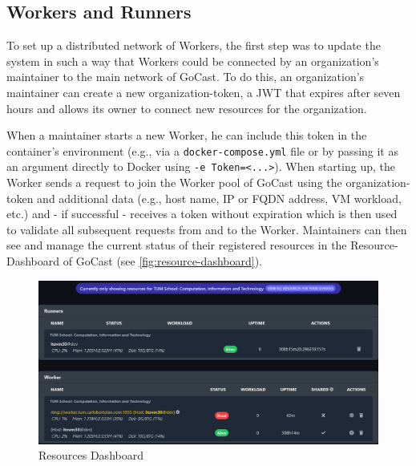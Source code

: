 \subsection{Workers and Runners}
To set up a distributed network of Workers, the first step was to update the system in such a way that Workers could be connected by an organization's maintainer to the main network of GoCast. To do this, an organization's maintainer can create a new organization-token, a \ac{JWT} that expires after seven hours and allows its owner to connect new resources for the organization. %


When a maintainer starts a new Worker, he can include this token in the container's environment (e.g., via a \texttt{docker-compose.yml} file or by passing it as an argument directly to Docker using \texttt{-e Token=<...>}). When starting up, the Worker sends a request to join the Worker pool of GoCast using the organization-token and additional data (e.g., host name, IP or FQDN address, \ac{VM} workload, etc.) and - if successful - receives a token without expiration which is then used to validate all subsequent requests from and to the Worker. Maintainers can then see and manage the current status of their registered resources in the Resource-Dashboard of GoCast (see \autoref{fig:resource-dashboard}).

\begin{figure}[htpb]
    \centering
    \includegraphics[width=390pt]{images/ResourceDashboard.png}
    \caption[Resources Dashboard]{Resources Dashboard}\label{fig:resource-dashboard}
\end{figure}


